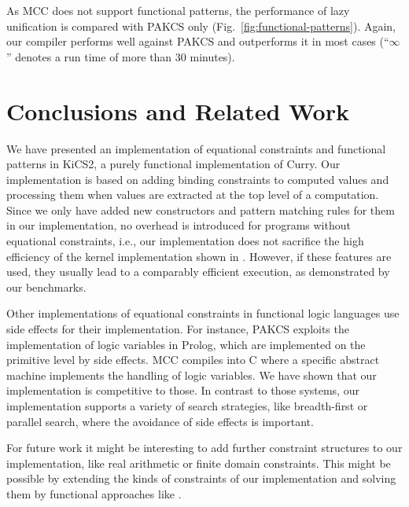 \documentclass{llncs}
\begin{document}
As MCC does not support functional patterns, the performance of lazy
unification is compared with PAKCS only (Fig.~\ref{fig:functional-patterns}).
Again, our compiler performs well against PAKCS
and outperforms it in most cases (``$\infty$'' denotes a run time
of more than 30 minutes).


\section{Conclusions and Related Work}
\label{sec:Conclusions}

We have presented an implementation of equational constraints
and functional patterns in KiCS2, a purely functional implementation
of Curry. Our implementation is based on adding binding constraints
to computed values and processing them when values are extracted
at the top level of a computation.
Since we only have added new constructors and pattern matching rules 
for them in our implementation, no overhead is introduced for programs
without equational constraints, i.e.,
our implementation does not sacrifice the high efficiency
of the kernel implementation shown in
\cite{BrasselHanusPeemoellerReck11}.
However, if these features are used, they usually lead
to a comparably efficient execution, as demonstrated by our benchmarks.

Other implementations of equational constraints in functional logic
languages use side effects for their implementation.
For instance, PAKCS \cite{Hanus10PAKCS}
exploits the implementation of logic variables in Prolog,
which are implemented on the primitive level by side effects.
MCC \cite{Lux99FLOPS} compiles into C where a specific
abstract machine implements the handling of logic variables.
We have shown that our implementation is competitive to those.
In contrast to those systems, our implementation supports
a variety of search strategies, like breadth-first or parallel search,
where the avoidance of side effects is important.

For future work it might be interesting to add
further constraint structures to our implementation, like real arithmetic
or finite domain constraints.
This might be possible by extending the kinds of constraints
of our implementation and solving them by
functional approaches like \cite{SchrijversStuckeyWadler09}.
\end{document}
